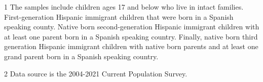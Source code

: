 \begin{table}

\caption{CPS Summary Statistics with Skin IAT Scores \label{tab:sumstat1}}
\centering
\begin{threeparttable}
\begin{tablenotes}
\item[1] The samples include children ages 17 and below who live in intact families. First-generation Hispanic immigrant children that were born in a Spanish speaking county. Native born second-generation Hispanic immigrant children with at least one parent born in a Spanish speaking country. Finally, native born third generation Hispanic immigrant children with native born parents and at least one grand parent born in a Spanish speaking country.
\item[2] Data source is the 2004-2021 Current Population Survey.
\end{tablenotes}
\end{threeparttable}
\end{table}
